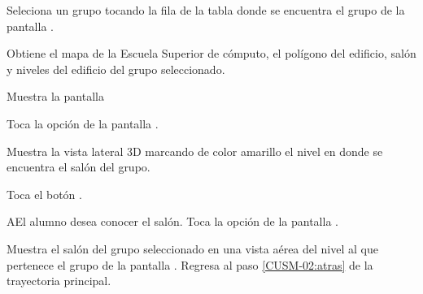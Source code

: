  \begin{UCtrayectoria}
 \UCpaso[\UCactor] Seleciona un grupo tocando la fila de la tabla donde se encuentra el grupo de la pantalla .

\UCpaso[\UCsist] Obtiene el mapa  de la Escuela Superior de cómputo, el polígono del edificio, salón y niveles del edificio del grupo seleccionado.  

\UCpaso[\UCsist] Muestra la pantalla 

\UCpaso[\UCactor] Toca la opción  de la pantalla .  

\UCpaso[\UCsist] Muestra la vista lateral 3D marcando de color amarillo el nivel  en donde se encuentra el salón del grupo.

\UCpaso[\UCactor] Toca el botón . \label{CUSM-02:atras}
 \end{UCtrayectoria}

 \begin{UCtrayectoriaA}{A}{El alumno desea conocer el salón.}
	\UCpaso[\UCactor] Toca la opción  de la pantalla  .
	
	\UCpaso[\UCsist] Muestra el salón del grupo seleccionado en una vista aérea del nivel al que pertenece el grupo de la pantalla .
	\UCpaso[] Regresa al paso \ref{CUSM-02:atras} de la trayectoria principal.
\end{UCtrayectoriaA}


%    
%   
% 

 
%
%
 